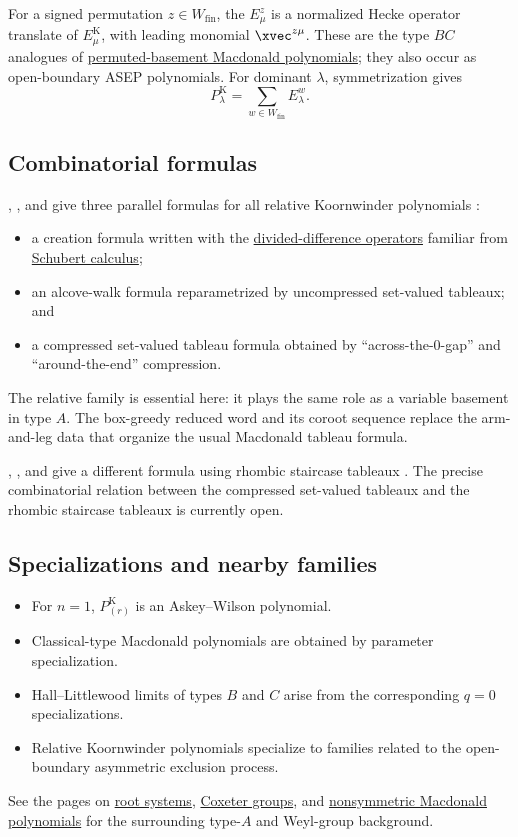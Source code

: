 For a signed permutation \(z\in W_{\mathrm{fin}}\), the
 \(E_\mu^z\) is a normalized Hecke
operator translate of \(E_\mu^{\mathrm K}\), with leading monomial
\(\xvec^{z\mu}\).  These are the type \(BC\) analogues of
\hyperref[macdonaldEperm]{permuted-basement Macdonald polynomials};
they also occur as open-boundary ASEP polynomials.  For dominant
\(\lambda\), symmetrization gives
\[
  P_\lambda^{\mathrm K}
  =\sum_{w\in W_{\mathrm{fin}}}E_\lambda^w.
\]


\subsection[koornwinderCombinatorialFormulas]{Combinatorial formulas}

, , and  give three
parallel formulas for all relative Koornwinder polynomials
\cite{ColmenarejoGagnonRam2026x}:

\begin{itemize}
\item a creation formula written with the
  \hyperref[dividedDifferenceOperators]{divided-difference operators} familiar
  from \hyperref[schubert]{Schubert calculus};
\item an alcove-walk formula reparametrized by uncompressed set-valued
  tableaux; and
\item a compressed set-valued tableau formula obtained by
  \enquote{across-the-\(0\)-gap} and \enquote{around-the-end} compression.
\end{itemize}

The relative family is essential here: it plays the same role as a variable
basement in type \(A\).  The box-greedy reduced word and its coroot sequence
replace the arm-and-leg data that organize the usual Macdonald tableau
formula.

, , and
 give a different formula using rhombic staircase
tableaux \cite{CorteelMandelshtamWilliams2024}.  The precise combinatorial
relation between the compressed set-valued tableaux and the rhombic
staircase tableaux is currently open.


\subsection[koornwinderSpecializations]{Specializations and nearby families}

\begin{itemize}
\item For \(n=1\), \(P_{(r)}^{\mathrm K}\) is an Askey--Wilson polynomial.
\item Classical-type Macdonald polynomials are obtained by parameter
  specialization.
\item Hall--Littlewood limits of types \(B\) and \(C\) arise from the
  corresponding \(q=0\) specializations.
\item Relative Koornwinder polynomials specialize to families related to the
  open-boundary asymmetric exclusion process.
\end{itemize}

See the pages on \hyperref[rootSystem]{root systems},
\hyperref[coxeterGroups]{Coxeter groups}, and
\hyperref[macdonaldE]{nonsymmetric Macdonald polynomials} for the surrounding
type-\(A\) and Weyl-group background.
